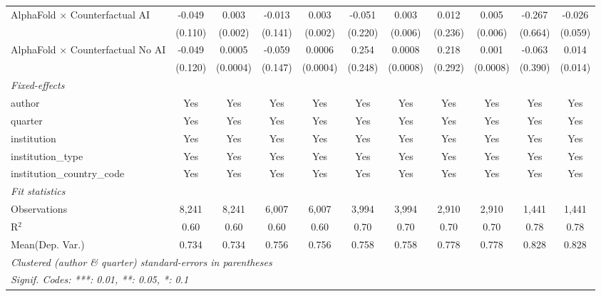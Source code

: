 \begin{tabular}{lcccccccccc}
   AlphaFold $\times$ Counterfactual AI     & -0.049  & 0.003    & -0.013  & 0.003        & -0.051  & 0.003    & 0.012   & 0.005    & -0.267  & -0.026\\   
                                            & (0.110) & (0.002)  & (0.141) & (0.002)      & (0.220) & (0.006)  & (0.236) & (0.006)  & (0.664) & (0.059)\\   
   AlphaFold $\times$ Counterfactual No AI  & -0.049  & 0.0005   & -0.059  & 0.0006       & 0.254   & 0.0008   & 0.218   & 0.001    & -0.063  & 0.014\\   
                                            & (0.120) & (0.0004) & (0.147) & (0.0004)     & (0.248) & (0.0008) & (0.292) & (0.0008) & (0.390) & (0.014)\\   
   \midrule
   \emph{Fixed-effects}\\
   author                                   & Yes     & Yes      & Yes     & Yes          & Yes     & Yes      & Yes     & Yes      & Yes     & Yes\\  
   quarter                                  & Yes     & Yes      & Yes     & Yes          & Yes     & Yes      & Yes     & Yes      & Yes     & Yes\\  
   institution                              & Yes     & Yes      & Yes     & Yes          & Yes     & Yes      & Yes     & Yes      & Yes     & Yes\\  
   institution\_type                        & Yes     & Yes      & Yes     & Yes          & Yes     & Yes      & Yes     & Yes      & Yes     & Yes\\  
   institution\_country\_code               & Yes     & Yes      & Yes     & Yes          & Yes     & Yes      & Yes     & Yes      & Yes     & Yes\\  
   \midrule
   \emph{Fit statistics}\\
   Observations                             & 8,241   & 8,241    & 6,007   & 6,007        & 3,994   & 3,994    & 2,910   & 2,910    & 1,441   & 1,441\\  
   R$^2$                                    & 0.60    & 0.60     & 0.60    & 0.60         & 0.70    & 0.70     & 0.70    & 0.70     & 0.78    & 0.78\\  
Mean(Dep. Var.) & 0.734 & 0.734 & 0.756 & 0.756 & 0.758 & 0.758 & 0.778 & 0.778 & 0.828 & 0.828 \\
   \midrule \midrule
   \multicolumn{11}{l}{\emph{Clustered (author \& quarter) standard-errors in parentheses}}\\
   \multicolumn{11}{l}{\emph{Signif. Codes: ***: 0.01, **: 0.05, *: 0.1}}\\
\end{tabular}
\par\endgroup

